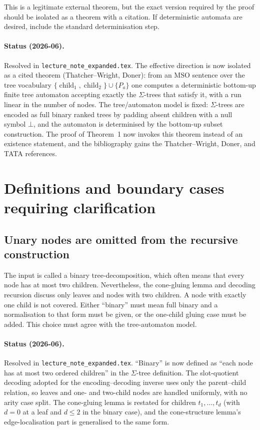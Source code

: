 \documentclass[11pt]{article}
\newcommand{\MSO}{\ensuremath{\mathrm{MSO}}}
\begin{document}
This is a legitimate external theorem, but the exact version required by the
proof should be isolated as a theorem with a citation.  If deterministic
automata are desired, include the standard determinisation step.

\paragraph{Status (2026-06).} Resolved in \texttt{lecture\_note\_expanded.tex}.
The effective direction is now isolated as a cited theorem (Thatcher--Wright,
Doner): from an \MSO{} sentence over the tree vocabulary
\(\{\operatorname{child}_1,\operatorname{child}_2\}\cup\{P_a\}\) one computes a
deterministic bottom-up finite tree automaton accepting exactly the
\(\Sigma\)-trees that satisfy it, with a run linear in the number of nodes.  The
tree/automaton model is fixed: \(\Sigma\)-trees are encoded as full binary ranked
trees by padding absent children with a null symbol \(\bot\), and the automaton is
determinised by the bottom-up subset construction.  The proof of Theorem~1 now
invokes this theorem instead of an existence statement, and the bibliography gains
the Thatcher--Wright, Doner, and TATA references.

\section{Definitions and boundary cases requiring clarification}

\subsection{Unary nodes are omitted from the recursive construction}

The input is called a binary tree-decomposition, which often means that every
node has at most two children.  Nevertheless, the cone-gluing lemma and decoding
recursion discuss only leaves and nodes with two children.  A node with exactly
one child is not covered.  Either ``binary'' must mean full binary and a
normalisation to that form must be given, or the one-child gluing case must be
added.  This choice must agree with the tree-automaton model.

\paragraph{Status (2026-06).} Resolved in \texttt{lecture\_note\_expanded.tex}.
``Binary'' is now defined as ``each node has at most two ordered children'' in the
\(\Sigma\)-tree definition.  The slot-quotient decoding adopted for the
encoding--decoding inverse uses only the parent--child relation, so leaves and
one- and two-child nodes are handled uniformly, with no arity case split.  The
cone-gluing lemma is restated for children \(t_1,\ldots,t_d\) (with \(d=0\) at a
leaf and \(d\le 2\) in the binary case), and the cone-structure lemma's
edge-localisation part is generalised to the same form.
\end{document}
